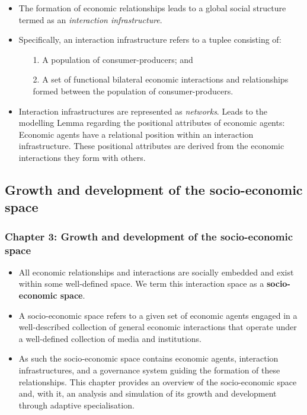 \documentclass[9pt]{beamer}
\begin{document}
\begin{frame} %
\begin{itemize}
\item The formation of economic relationships leads to a global social structure termed as an \emph{interaction infrastructure}.
\medskip
\item Specifically, an interaction infrastructure refers to a tuplee consisting of:
\begin{itemize}
\medskip
\item[1.] A population of consumer-producers; and
\medskip
\item[2.] A set of functional bilateral economic interactions and relationships formed between the population of consumer-producers.
\end{itemize}
\medskip
\item Interaction infrastructures are represented as \emph{networks}.
\medskip
\ietm Leads to the modelling Lemma regarding the positional attributes of economic agents: Economic agents have a relational position within an interaction infrastructure. These positional attributes are derived from the economic interactions they form with others.
\end{itemize}
\end{frame}

\subsection{Growth and development of the socio-economic space}

\begin{frame} \frametitle{Chapter 3: Growth and development of the socio-economic space}
\begin{itemize}
\item All economic relationships and interactions are socially embedded and exist within some well-defined space. We term this interaction space as a \textbf{socio-economic space}.
\medskip
\item A socio-economic space refers to a given set of economic agents engaged in a well-described collection of general economic interactions that operate under a well-defined collection of media and institutions.
\medskip
\item As such the socio-economic space contains economic agents, interaction infrastructures, and a governance system guiding the formation of these relationships.
\medskip
\ietm This chapter provides an overview of the socio-economic space and, with it, an analysis and simulation of its growth and development through adaptive specialisation.
\end{itemize}
\end{frame}
\end{document}
